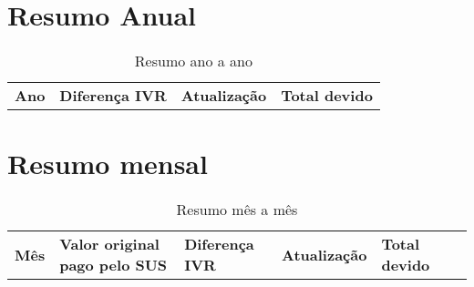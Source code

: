 \documentclass{report}
\begin{document}
\section{Resumo Anual}
\begin{longtable}[c]{|c|c|c|c|}
\caption{Resumo ano a ano} \\ \hline
\textbf{Ano} &
\textbf{Diferença IVR} &
\textbf{Atualização} &
\textbf{Total devido}
\endhead \hline

\end{longtable}
\section{Resumo mensal}
\begin{longtable}[c]{|p{1.7cm}|p{2.6cm}|p{2.6cm}|p{2.3cm}|p{2.3cm}|c|}
\caption{Resumo mês a mês} \\ \hline
\textbf{Mês} &
\textbf{Valor original pago pelo SUS} &
\textbf{Diferença IVR} &
\textbf{Atualização} &
\textbf{Total devido}
\endhead \hline

\end{longtable}
\end{document}
